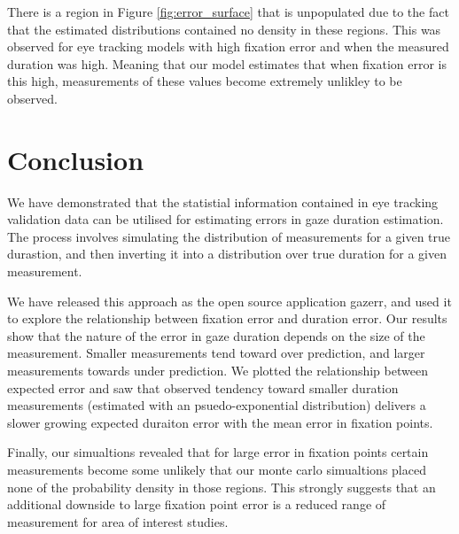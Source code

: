 \documentclass[12pt,a4paper]{article}
\numberwithin{equation}{section}
\begin{document}
There is a region in Figure \ref{fig:error_surface} that is unpopulated due to the fact that
the estimated distributions contained no density in these regions. This was observed for 
eye tracking models with high fixation error and when the measured duration was high. Meaning
that our model estimates that when fixation error is this high, measurements of these values
become extremely unlikley to be observed.

\section{Conclusion}

We have demonstrated that the statistial information contained in eye tracking validation
data can be utilised for estimating errors in gaze duration estimation. The process involves
simulating the distribution of measurements for a given true durastion, and then inverting
it into a distribution over true duration for a given measurement.

We have released this approach as the open source application gazerr, and used it to explore
the relationship between fixation error and duration error. Our results show that the nature
of the error in gaze duration depends on the size of the measurement. Smaller measurements
tend toward over prediction, and larger measurements towards under prediction. We plotted
the relationship between expected error and saw that observed tendency toward smaller duration
measurements (estimated with an psuedo-exponential distribution) delivers a slower growing
expected duraiton error with the mean error in fixation points.

Finally, our simualtions revealed that for large error in fixation points certain measurements
become some unlikely that our monte carlo simualtions placed none of the probability density
in those regions. This strongly suggests that an additional downside to large fixation point error
is a reduced range of measurement for area of interest studies.





\end{document}
